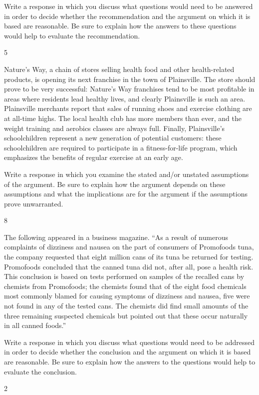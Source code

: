 \documentclass[]{article}
\begin{document}
Write a response in which you discuss what questions would need to be
answered in order to decide whether the recommendation and the argument
on which it is based are reasonable. Be sure to explain how the answers
to these questions would help to evaluate the recommendation.

5

Nature's Way, a chain of stores selling health food and other
health-related products, is opening its next franchise in the town of
Plainsville. The store should prove to be very successful: Nature's Way
franchises tend to be most profitable in areas where residents lead
healthy lives, and clearly Plainsville is such an area. Plainsville
merchants report that sales of running shoes and exercise clothing are
at all-time highs. The local health club has more members than ever, and
the weight training and aerobics classes are always full. Finally,
Plainsville's schoolchildren represent a new generation of potential
customers: these schoolchildren are required to participate in a
fitness-for-life program, which emphasizes the benefits of regular
exercise at an early age.

Write a response in which you examine the stated and/or unstated
assumptions of the argument. Be sure to explain how the argument depends
on these assumptions and what the implications are for the argument if
the assumptions prove unwarranted.

8

The following appeared in a business magazine. ``As a result of numerous
complaints of dizziness and nausea on the part of consumers of
Promofoods tuna, the company requested that eight million cans of its
tuna be returned for testing. Promofoods concluded that the canned tuna
did not, after all, pose a health risk. This conclusion is based on
tests performed on samples of the recalled cans by chemists from
Promofoods; the chemists found that of the eight food chemicals most
commonly blamed for causing symptoms of dizziness and nausea, five were
not found in any of the tested cans. The chemists did find small amounts
of the three remaining suspected chemicals but pointed out that these
occur naturally in all canned foods.''

Write a response in which you discuss what questions would need to be
addressed in order to decide whether the conclusion and the argument on
which it is based are reasonable. Be sure to explain how the answers to
the questions would help to evaluate the conclusion.

2
\end{document}
